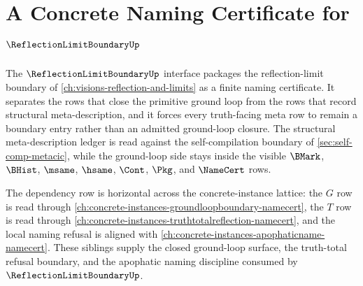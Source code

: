 \chapter{A Concrete Naming Certificate for $\ReflectionLimitBoundaryUp$}
\label{ch:concrete-instances-reflectionlimitboundary-namecert}

The $\ReflectionLimitBoundaryUp$ interface packages the reflection-limit boundary of \autoref{ch:visions-reflection-and-limits} as a finite naming certificate. It separates the rows that close the primitive ground loop from the rows that record structural meta-description, and it forces every truth-facing meta row to remain a boundary entry rather than an admitted ground-loop closure. The structural meta-description ledger is read against the self-compilation boundary of \autoref{sec:self-comp-metacic}, while the ground-loop side stays inside the visible $\BMark$, $\BHist$, $\msame$, $\hsame$, $\Cont$, $\Pkg$, and $\NameCert$ rows.

The dependency row is horizontal across the concrete-instance lattice: the $G$ row is read through \autoref{ch:concrete-instances-groundloopboundary-namecert}, the $T$ row is read through \autoref{ch:concrete-instances-truthtotalreflection-namecert}, and the local naming refusal is aligned with \autoref{ch:concrete-instances-apophaticname-namecert}. These siblings supply the closed ground-loop surface, the truth-total refusal boundary, and the apophatic naming discipline consumed by $\ReflectionLimitBoundaryUp$.

